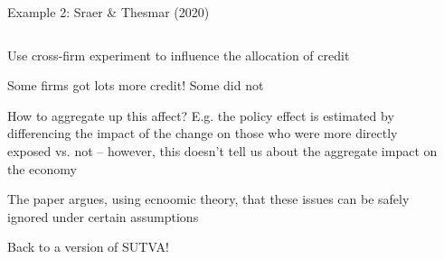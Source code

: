 \documentclass[notes,11pt, aspectratio=169]{beamer}
\newenvironment{wideitemize}{\itemize\addtolength{\itemsep}{10pt}}{\enditemize}
\begin{document}
\begin{frame}{Example 2: Sraer \& Thesmar (2020)}
\begin{columns}[T] %
  \begin{column}{.5\textwidth}
    \begin{wideitemize}
    \item Use cross-firm experiment to influence the allocation of credit
    \item Some firms got lots more credit! Some did not
    \item How to aggregate up this affect? E.g. the policy effect is
      estimated by differencing the impact of the change on those who
      were more directly exposed vs. not -- however, this doesn't tell
      us about the aggregate impact on the economy
    \item The paper argues, using ecnoomic theory, that these issues can be safely ignored under certain assumptions
    \item Back to a version of SUTVA!
    \end{wideitemize}
  \end{column}%
  \hfill%
  \begin{column}{.5\textwidth}
    \begin{center}
\end{center}
\end{column}
\end{columns}
\end{frame}
\end{document}
